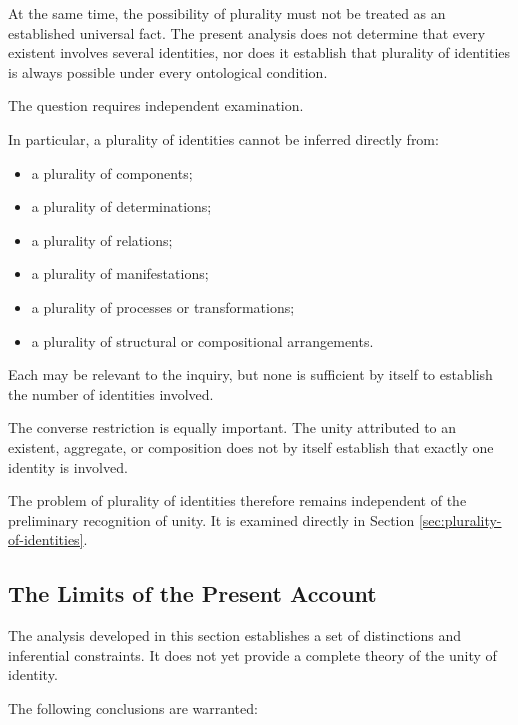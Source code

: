At the same time, the possibility of plurality
must not be treated as an established universal
fact. The present analysis does not determine
that every existent involves several identities,
nor does it establish that plurality of identities
is always possible under every ontological condition.

The question requires independent examination.

In particular, a plurality of identities cannot
be inferred directly from:

\begin{itemize}
    \item a plurality of components;
    \item a plurality of determinations;
    \item a plurality of relations;
    \item a plurality of manifestations;
    \item a plurality of processes or transformations;
    \item a plurality of structural or compositional
    arrangements.
\end{itemize}

Each may be relevant to the inquiry, but none
is sufficient by itself to establish the number
of identities involved.

The converse restriction is equally important.
The unity attributed to an existent, aggregate,
or composition does not by itself establish
that exactly one identity is involved.

The problem of plurality of identities therefore
remains independent of the preliminary recognition
of unity. It is examined directly in Section
\ref{sec:plurality-of-identities}.

\subsection{The Limits of the Present Account}

The analysis developed in this section establishes
a set of distinctions and inferential constraints.
It does not yet provide a complete theory of
the unity of identity.

The following conclusions are warranted:

